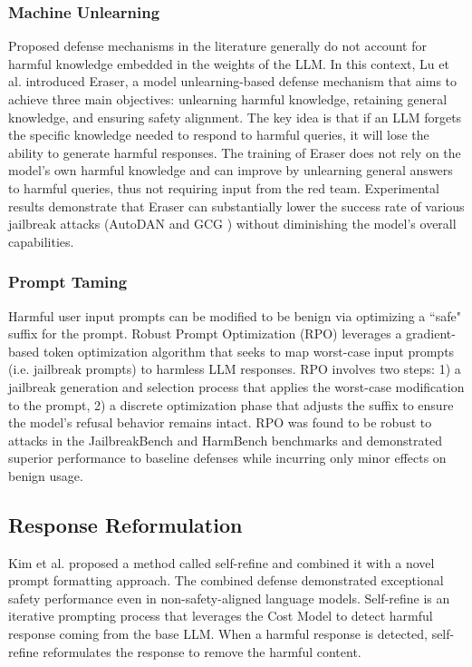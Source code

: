 \subsubsection{Machine Unlearning}

Proposed defense mechanisms in the literature generally do not account for harmful knowledge embedded in the weights of the LLM. In this context, Lu et al. \cite{lu_2024b} introduced Eraser, a model unlearning-based defense mechanism that aims to achieve three main objectives: unlearning harmful knowledge, retaining general knowledge, and ensuring safety alignment. The key idea is that if an LLM forgets the specific knowledge needed to respond to harmful queries, it will lose the ability to generate harmful responses. The training of Eraser does not rely on the model’s own harmful knowledge and can improve by unlearning general answers to harmful queries, thus not requiring input from the red team. Experimental results demonstrate that Eraser can substantially lower the success rate of various jailbreak attacks (AutoDAN \cite{liu_2024b} and GCG \cite{zou_2023a}) without diminishing the model’s overall capabilities.

\subsubsection{Prompt Taming}

Harmful user input prompts can be modified to be benign via optimizing a ``safe" suffix for the prompt. Robust Prompt Optimization (RPO) \cite{zhou_2024b} leverages a gradient-based token optimization algorithm that seeks to map worst-case input prompts (i.e. jailbreak prompts) to harmless LLM responses. RPO involves two steps: 1) a jailbreak generation and selection process that applies the worst-case modification to the prompt, 2) a discrete optimization phase that adjusts the suffix to ensure the model's refusal behavior remains intact. RPO was found to be robust to attacks in the JailbreakBench \cite{chao_2024a} and HarmBench \cite{mazeika_2024a} benchmarks and demonstrated superior performance to baseline defenses while incurring only minor effects on benign usage. 

\subsection{Response Reformulation}

Kim et al. \cite{kim_2024b} proposed a method called self-refine and combined it with a novel prompt formatting approach. The combined defense demonstrated exceptional safety performance even in non-safety-aligned language models. Self-refine is an iterative prompting process that leverages the Cost Model \cite{dai_2023a} to detect harmful response coming from the base LLM. When a harmful response is detected, self-refine reformulates the response to remove the harmful content.

